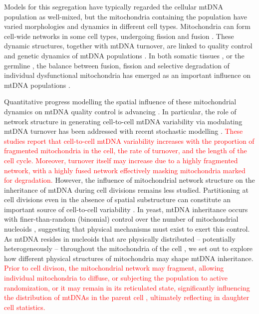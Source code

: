 \documentclass{article}
\begin{document}
Models for this segregation have typically regarded the cellular mtDNA population as well-mixed, but the mitochondria containing the population have varied morphologies and dynamics in different cell types. Mitochondria can form cell-wide networks in some cell types, undergoing fission and fusion \citep{mendoza2020mitochondrial, sukhorukov2012emergence, hoitzing2015function, zamponi2018mitochondrial, carlton2020membrane}. These dynamic structures, together with mtDNA turnover, are linked to quality control and genetic dynamics of mtDNA populations \citep{jakubke2021cristae,pla2019reshaping, chapman2020maintenance}. In both somatic tissues \citep{mouli2009frequency, tam2013mathematical, patel2013optimal, tam2015context}, or the germline \citep{edwards2021avoiding, lieber2019mitochondrial}, the balance between fusion, fission and selective degradation of individual dysfunctional mitochondria has emerged as an important influence on mtDNA populations \citep{mouli2009frequency,patel2013optimal,twig2008fission, twig2008mitochondrial, figge2012deceleration}. 

Quantitative progress modelling the spatial influence of these mitochondrial dynamics on mtDNA quality control is advancing \citep{mouli2009frequency, tam2013mathematical, patel2013optimal, tam2015context,figge2012deceleration}. In particular, the role of network structure in generating cell-to-cell mtDNA variability via modulating mtDNA turnover has been addressed with recent stochastic modelling \citep{edwards2021avoiding, aryaman2019mitochondrial}. \textcolor{red}{These studies report that cell-to-cell mtDNA variability increases with the proportion of fragmented mitochondria in the cell, the rate of turnover, and the length of the cell cycle. Moreover, turnover itself may increase due to a highly fragmented network, with a highly fused network effectively masking mitochondria marked for degradation.} However, the influence of mitochondrial network structure on the inheritance of mtDNA during cell divisions remains less studied. Partitioning at cell divisions even in the absence of spatial substructure can constitute an important source of cell-to-cell variability \citep{huh2011non, johnston2015closed}. In yeast, mtDNA inheritance occurs with finer-than-random (binomial) control over the number of mitochondrial nucleoids \citep{jajoo2016accurate}, suggesting that physical mechanisms must exist to exert this control. As mtDNA resides in nucleoids that are physically distributed -- potentially heterogeneously -- throughout the mitochondria of the cell \citep{ilamathi2021new}, we set out to explore how different physical structures of mitochondria may shape mtDNA inheritance. \textcolor{red}{Prior to cell divison, the mitochondrial network may fragment, allowing individual mitochondria to diffuse, or subjecting the population to active randomization\citep{moore2021actin}, or it may remain in its reticulated state, significantly influencing the distribution of mtDNAs in the parent cell \citep{mendoza2020mitochondrial}, ultimately reflecting in daughter cell statistics.}
\end{document}
